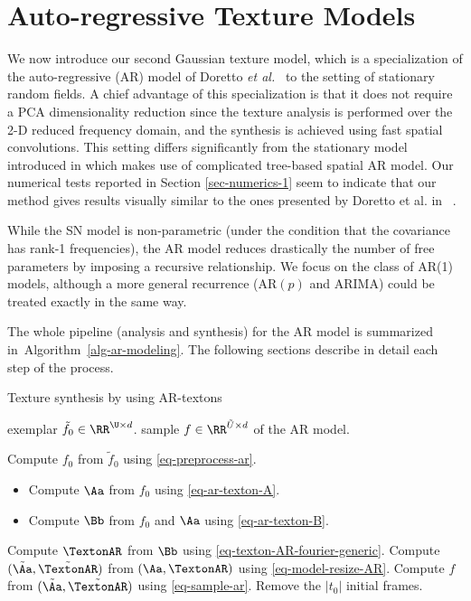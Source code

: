 \section{Auto-regressive Texture Models}
\label{sec-ar}

We now introduce our second Gaussian texture model, which is a specialization of the auto-regressive (AR) model of Doretto \emph{et al.}~\cite{dorettoCWS03ijcv} to the setting of stationary random fields. A chief advantage of this specialization is that it does not require a PCA dimensionality reduction since the texture analysis is performed over the 2-D reduced frequency domain, and the synthesis is achieved using fast spatial convolutions. This setting differs significantly from the stationary model introduced in \cite{Doretto04spatiallyhomogeneous} which makes use of complicated tree-based spatial AR model. Our numerical tests reported in Section \ref{sec-numerics-1} seem to indicate that our method gives results visually similar to the ones presented by Doretto et al. in ~\cite{Doretto04spatiallyhomogeneous}.

While the SN model is non-parametric (under the condition that the covariance has rank-1 frequencies), the AR model reduces drastically the number of free parameters by imposing a recursive relationship. We focus on the class of AR(1) models, although a more general recurrence (AR$(p)$ and ARIMA) could be treated exactly in the same way.


The whole pipeline (analysis and synthesis) for the AR model is summarized in~Algorithm~\ref{alg-ar-modeling}. The following sections describe in detail each step of the process. 


\begin{algorithm}[ht!]
\caption{Texture synthesis by using AR-textons}
\label{alg-ar-modeling}
\begin{algorithmic}[1]
\Require exemplar $\tilde f_0 \in \RR^{\U \times d}$.
\Ensure sample $f \in \RR^{\tilde U \times d}$ of the AR model.
\Statex
\begin{enumerate}
	 Compute $f_0$ from $\tilde f_0$ using \eqref{eq-preprocess-ar}.
		\begin{itemize}
			\item Compute $\Aa$ from $f_0$ using \eqref{eq-ar-texton-A}.
			\item Compute $\Bb$ from $f_0$ and $\Aa$ using \eqref{eq-ar-texton-B}.
		\end{itemize}
	 Compute $\TextonAR$ from $\Bb$ using \eqref{eq-texton-AR-fourier-generic}.
	 Compute $(\tilde \Aa,\tilde \TextonAR)$ from $(\Aa,\TextonAR)$ using \eqref{eq-model-resize-AR}.
	 Compute $f$ from $(\tilde \Aa,\tilde \TextonAR)$ using \eqref{eq-sample-ar}. Remove the $|t_0|$ initial frames.
\end{enumerate}
\end{algorithmic}
\end{algorithm}


